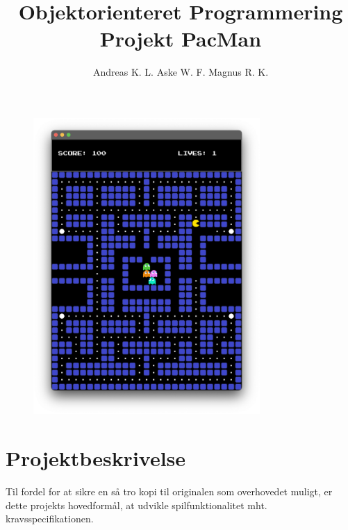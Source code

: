 \documentclass{article}
\title{\textbf{Objektorienteret Programmering Projekt PacMan}}
\author{Andreas K. L. \quad Aske W. F. \quad Magnus R. K.}
\theoremstyle{mytheoremstyle}
\theoremstyle{mytheoremstyle}
\theoremstyle{myproblemstyle}
\begin{document}
\begin{titlepage}
    \maketitle
    \begin{figure}[H]
        \begin{center}
            \includegraphics[width=0.77\textwidth]{figures/FrontPageImage.png}
        \end{center}
    \end{figure}
\end{titlepage}
    \clearpage
    \newpage
    \setcounter{page}{1}

    \pagestyle{fancy}

    \tableofcontents
    \newpage
\section{Projektbeskrivelse}\label{sec:Beskrivelse} %

Til fordel for at sikre en så tro kopi til originalen som overhovedet muligt, er
dette projekts hovedformål, at udvikle spilfunktionalitet mht.
kravsspecifikationen. 
\end{document}
